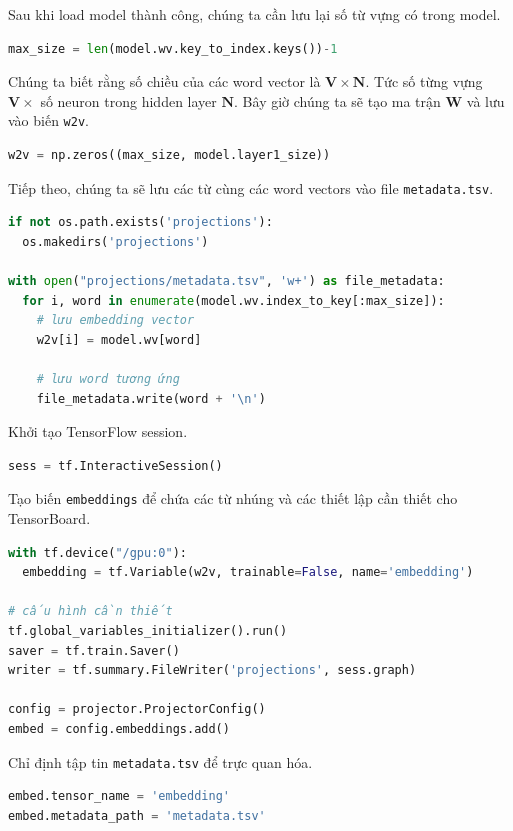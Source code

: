 \documentclass[12pt]{article}
\begin{document}
\vskip 0.5cm
\indent Sau khi load model thành công, chúng ta cần lưu lại số từ vựng có trong model.
\begin{lstlisting}[language=python]
max_size = len(model.wv.key_to_index.keys())-1
\end{lstlisting}

\vskip 0.5cm
\indent Chúng ta biết rằng số chiều của các word vector là $\boldsymbol{V} \times \boldsymbol{N}$. Tức số từng vựng $\boldsymbol{V} \times$ số neuron trong hidden layer $\boldsymbol{N}$. Bây giờ chúng ta sẽ tạo ma trận $\boldsymbol{W}$ và lưu vào biến \texttt{w2v}.
\begin{lstlisting}[language=python]
w2v = np.zeros((max_size, model.layer1_size))
\end{lstlisting}

\vskip 0.5cm
\indent Tiếp theo, chúng ta sẽ lưu các từ cùng các word vectors vào file \texttt{metadata.tsv}.
\begin{lstlisting}[language=python]
if not os.path.exists('projections'):
  os.makedirs('projections')
  
with open("projections/metadata.tsv", 'w+') as file_metadata:    
  for i, word in enumerate(model.wv.index_to_key[:max_size]):
    # lưu embedding vector
    w2v[i] = model.wv[word]
      
    # lưu word tương ứng 
    file_metadata.write(word + '\n')
\end{lstlisting}

\vskip 0.5cm
\indent Khởi tạo TensorFlow session.
\begin{lstlisting}[language=python]
sess = tf.InteractiveSession()
\end{lstlisting}

\vskip 0.5cm
\indent Tạo biến \texttt{embeddings} để chứa các từ nhúng và các thiết lập cần thiết cho TensorBoard.
\begin{lstlisting}[language=python]
with tf.device("/gpu:0"):
  embedding = tf.Variable(w2v, trainable=False, name='embedding')

# cấu hình cần thiết
tf.global_variables_initializer().run()
saver = tf.train.Saver()
writer = tf.summary.FileWriter('projections', sess.graph)

config = projector.ProjectorConfig()
embed = config.embeddings.add()
\end{lstlisting}

\vskip 0.5cm
\indent Chỉ định tập tin \texttt{metadata.tsv} để trực quan hóa.
\begin{lstlisting}[language=python]
embed.tensor_name = 'embedding'
embed.metadata_path = 'metadata.tsv'
\end{lstlisting}
\end{document}
